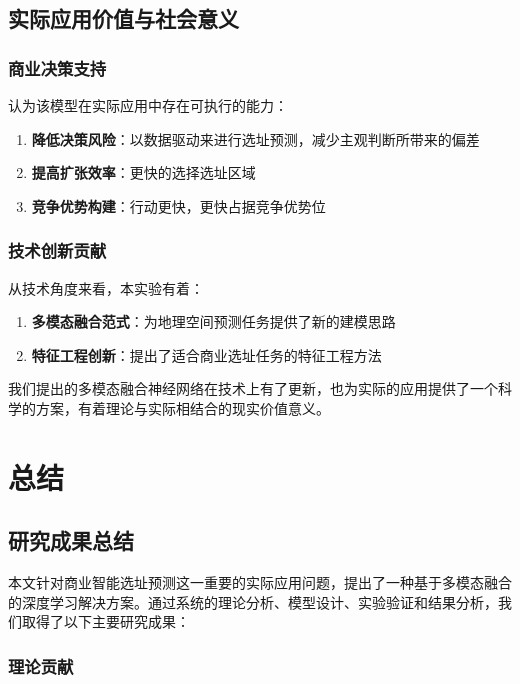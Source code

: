 \documentclass{article}
\begin{document}
\subsection{实际应用价值与社会意义}

\subsubsection{商业决策支持}

认为该模型在实际应用中存在可执行的能力：

\begin{enumerate}
\item \textbf{降低决策风险}：以数据驱动来进行选址预测，减少主观判断所带来的偏差
\item \textbf{提高扩张效率}：更快的选择选址区域
\item \textbf{竞争优势构建}：行动更快，更快占据竞争优势位
\end{enumerate}

\subsubsection{技术创新贡献}

从技术角度来看，本实验有着：

\begin{enumerate}
\item \textbf{多模态融合范式}：为地理空间预测任务提供了新的建模思路
\item \textbf{特征工程创新}：提出了适合商业选址任务的特征工程方法
\end{enumerate}

我们提出的多模态融合神经网络在技术上有了更新，也为实际的应用提供了一个科学的方案，有着理论与实际相结合的现实价值意义。

\section{总结}

\subsection{研究成果总结}

本文针对商业智能选址预测这一重要的实际应用问题，提出了一种基于多模态融合的深度学习解决方案。通过系统的理论分析、模型设计、实验验证和结果分析，我们取得了以下主要研究成果：

\subsubsection{理论贡献}
\end{document}
